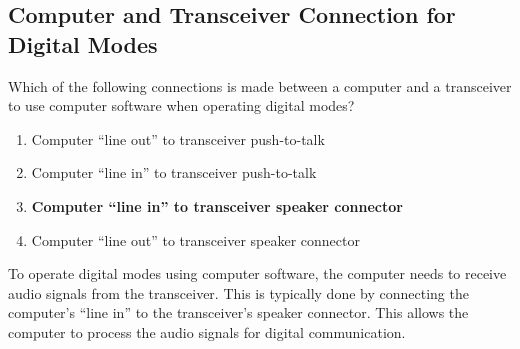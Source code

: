 \subsection{Computer and Transceiver Connection for Digital Modes}
\label{T4A07}

\begin{tcolorbox}[colback=gray!10!white,colframe=black!75!black,title=T4A07]
Which of the following connections is made between a computer and a transceiver to use computer software when operating digital modes?
\begin{enumerate}[noitemsep]
    \item Computer “line out” to transceiver push-to-talk
    \item Computer “line in” to transceiver push-to-talk
    \item \textbf{Computer “line in” to transceiver speaker connector}
    \item Computer “line out” to transceiver speaker connector
\end{enumerate}
\end{tcolorbox}

To operate digital modes using computer software, the computer needs to receive audio signals from the transceiver. This is typically done by connecting the computer's “line in” to the transceiver's speaker connector. This allows the computer to process the audio signals for digital communication.